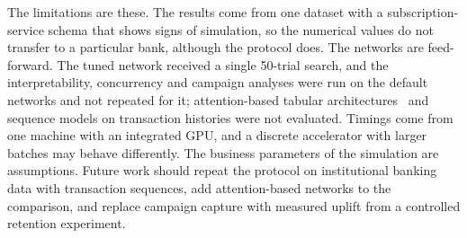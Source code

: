 \documentclass[conference]{IEEEtran}
\begin{document}
The limitations are these. The results come from one dataset with a subscription-service schema that shows signs of simulation, so the numerical values do not transfer to a particular bank, although the protocol does. The networks are feed-forward. The tuned network received a single 50-trial search, and the interpretability, concurrency and campaign analyses were run on the default networks and not repeated for it; attention-based tabular architectures~\cite{pasaribu2024tabular} and sequence models on transaction histories were not evaluated. Timings come from one machine with an integrated GPU, and a discrete accelerator with larger batches may behave differently. The business parameters of the simulation are assumptions. Future work should repeat the protocol on institutional banking data with transaction sequences, add attention-based networks to the comparison, and replace campaign capture with measured uplift from a controlled retention experiment.



\end{document}
